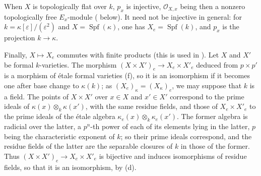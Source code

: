 When \(X\) is topologically flat over \(k\), \(p_x\) is injective,
\(\mathcal O_{X,x}\) being then a nonzero topologically free
\(E_x\)-module \textup{( below)}. It need not be injective in
general: for \(k=\kappa[\varepsilon]/(\varepsilon^2)\) and
\(X=\operatorname{Spf}(\kappa)\), one has \(X_e=\operatorname{Spf}(k)\),
and \(p_x\) is the projection \(k\to\kappa\).

Finally, \(X\mapsto X_e\) commutes with finite products \textup{(this is
used in )}. Let \(X\) and \(X'\) be formal \(k\)-varieties.
The morphism \((X\times X')_e\to X_e\times X'_e\) deduced from
\(p\times p'\) is a morphism of étale formal varieties \textup{(f)}, so
it is an isomorphism if it becomes one after base change to
\(\kappa(k)\); as \((X_e)_\kappa=(X_\kappa)_e\), we may suppose that
\(k\) is a field. The points of \(X\times X'\) over \(x\in X\) and
\(x'\in X'\) correspond to the prime ideals of
\(\kappa(x)\otimes_k\kappa(x')\), with the same residue fields, and
those of \(X_e\times X'_e\) to the prime ideals of the étale algebra
\(\kappa_e(x)\otimes_k\kappa_e(x')\). The former algebra is radicial
over the latter, a \(p^n\)-th power of each of its elements lying in
the latter, \(p\) being the characteristic exponent of \(k\); so their
prime ideals correspond, and the residue fields of the latter are the
separable closures of \(k\) in those of the former. Thus
\((X\times X')_e\to X_e\times X'_e\) is bijective and induces
isomorphisms of residue fields, so that it is an isomorphism, by
\textup{(d)}.
